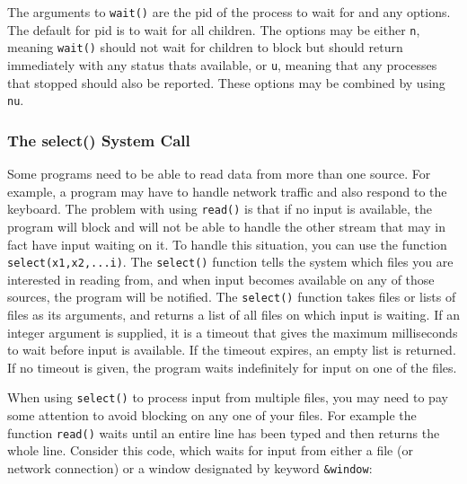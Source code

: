 The arguments to \texttt{wait()} are the pid of the process to wait for
and any options. The default for pid is to wait for all children. The
options may be either \texttt{{\textquotedbl}n{\textquotedbl}}, meaning
\texttt{wait()} should not wait for children to block but should return
immediately with any status that{\textquotesingle}s available, or
\texttt{{\textquotedbl}u{\textquotedbl}}, meaning that any processes
that stopped should also be reported. These options may be combined by
using \texttt{{\textquotedbl}nu{\textquotedbl}}.

\subsubsection[The select() System Call]{The select() System Call}
Some programs need to be able to read data from more than one source.
For example, a program may have to handle network traffic and also
respond to the keyboard. The problem with using
\texttt{read()} is that if no input is available, the program will
block and will not be able to handle the other stream that may in fact
have input waiting on it. To handle this situation, you can use the
function \texttt{select(x1,x2,...i)}. The
\texttt{select()} function tells the system which files
you are interested in reading from, and when input becomes available on
any of those sources, the program will be notified. The
\texttt{select()} function takes files or lists of files as its
arguments, and returns a list of all files on which input is waiting.
If an integer argument is supplied, it is a timeout that gives the
maximum milliseconds to wait before input is available. If the timeout
expires, an empty list is returned. If no timeout is given, the program
waits indefinitely for input on one of the files.


When using \texttt{select()} to process input from multiple files, you
may need to pay some attention to avoid blocking on any one of your
files. For example the function \texttt{read()} waits until an entire
line has been typed and then returns the whole line. Consider this
code, which waits for input from either a file (or network connection)
or a window designated by keyword \texttt{\&window}:

